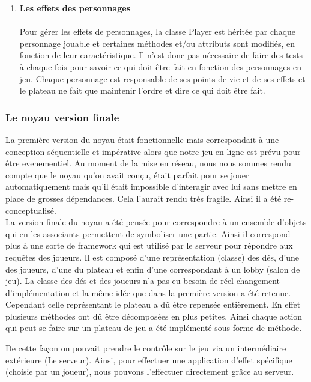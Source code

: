 \documentclass[a4paper,11pt]{article}
\begin{document}
\begin{enumerate}
	\item \textbf{Les effets des personnages} \\\\
	Pour gérer les effets de personnages, la classe Player est héritée par chaque personnage jouable et certaines méthodes et/ou attributs sont modifiés, en fonction de leur caractéristique. Il n’est donc pas nécessaire de faire des tests à chaque fois pour savoir ce qui doit être fait en fonction des personnages en jeu. Chaque personnage est responsable de ses points de vie et de ses effets et le plateau ne fait que maintenir l’ordre et dire ce qui doit être fait.

\end{enumerate}

\subsubsection{Le noyau version finale}

	La première version du noyau était fonctionnelle mais correspondait à une conception séquentielle et impérative alors que notre jeu en ligne est prévu pour être evenementiel.  Au moment de la mise en réseau, nous nous sommes rendu compte que le noyau qu’on avait conçu, était parfait pour se jouer automatiquement mais qu’il était impossible d’interagir avec lui sans mettre en place de grosses dépendances. Cela l’aurait rendu très fragile. Ainsi il a été re-conceptualisé. \\
	 
	La version finale du noyau a été pensée pour correspondre à un ensemble d’objets qui en les associants permettent de symboliser une partie. Ainsi il correspond plus à une sorte de framework qui est utilisé par le serveur pour répondre aux requêtes des joueurs. Il est composé d’une représentation (classe) des dés, d'une des joueurs, d'une du plateau et enfin d'une correspondant à un lobby (salon de jeu). 
    La classe des dés et des joueurs n’a pas eu besoin de réel changement d'implémentation et la même idée que dans la première version a été retenue. Cependant celle représentant le plateau a dû être repensée entièrement. En effet plusieurs méthodes ont dû être décomposées en plus petites. Ainsi chaque action qui peut se faire sur un plateau de jeu a été implémenté sous forme de méthode.
	

	 De cette façon on pouvait prendre le contrôle sur le jeu via un intermédiaire extérieure (Le serveur). Ainsi, pour effectuer une application d'effet spécifique (choisie par un joueur), nous pouvons l’effectuer directement grâce au serveur. \\
	
\end{document}
